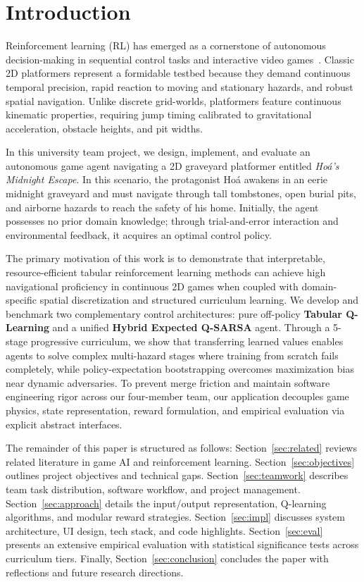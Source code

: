 \section{Introduction}
\label{sec:intro}

Reinforcement learning (RL) has emerged as a cornerstone of autonomous decision-making in sequential control tasks and interactive video games~\cite{mnih2015human,sutton2018reinforcement}. Classic 2D platformers represent a formidable testbed because they demand continuous temporal precision, rapid reaction to moving and stationary hazards, and robust spatial navigation. Unlike discrete grid-worlds, platformers feature continuous kinematic properties, requiring jump timing calibrated to gravitational acceleration, obstacle heights, and pit widths.

In this university team project, we design, implement, and evaluate an autonomous game agent navigating a 2D graveyard platformer entitled \textit{Ho{\'a}'s Midnight Escape}. In this scenario, the protagonist Ho{\'a} awakens in an eerie midnight graveyard and must navigate through tall tombstones, open burial pits, and airborne hazards to reach the safety of his home. Initially, the agent possesses no prior domain knowledge; through trial-and-error interaction and environmental feedback, it acquires an optimal control policy.

The primary motivation of this work is to demonstrate that interpretable, resource-efficient tabular reinforcement learning methods can achieve high navigational proficiency in continuous 2D games when coupled with domain-specific spatial discretization and structured curriculum learning. We develop and benchmark two complementary control architectures: pure off-policy \textbf{Tabular Q-Learning} and a unified \textbf{Hybrid Expected Q-SARSA} agent. Through a 5-stage progressive curriculum, we show that transferring learned values enables agents to solve complex multi-hazard stages where training from scratch fails completely, while policy-expectation bootstrapping overcomes maximization bias near dynamic adversaries. To prevent merge friction and maintain software engineering rigor across our four-member team, our application decouples game physics, state representation, reward formulation, and empirical evaluation via explicit abstract interfaces.

The remainder of this paper is structured as follows: Section~\ref{sec:related} reviews related literature in game AI and reinforcement learning. Section~\ref{sec:objectives} outlines project objectives and technical gaps. Section~\ref{sec:teamwork} describes team task distribution, software workflow, and project management. Section~\ref{sec:approach} details the input/output representation, Q-learning algorithms, and modular reward strategies. Section~\ref{sec:impl} discusses system architecture, UI design, tech stack, and code highlights. Section~\ref{sec:eval} presents an extensive empirical evaluation with statistical significance tests across curriculum tiers. Finally, Section~\ref{sec:conclusion} concludes the paper with reflections and future research directions.
